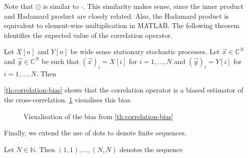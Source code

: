 \documentclass[a4paper, openany, oneside]{memoir}
\begin{document}
Note that $\odot$ is similar to $\cdot$. This similarity makes sense, since the inner product and Hadamard product are closely related. Also, the Hadamard product is equivalent to element-wise multiplication in MATLAB.
The following theorem identifies the expected value of the correlation operator.

\begin{blockTheorem} 
    Let $X[n]$ and $Y[n]$ be wide sense stationary stochastic processes. Let $\vec{x} \in \mathbb{C}^N$ and $\vec{y} \in \mathbb{C}^N$ be such that $(\vec{x})_i = X[i]$ for $i=1,\ldots,N$ and $(\vec{y})_i = Y[i]$ for $i=1,\ldots,N$.  Then

     \nolinebreak
\end{blockTheorem}

\cref{th:correlation-bias} shows that the correlation operator is a biased estimator of the cross-correlation. \cref{fig:vis-bias} visualises this bias.

\begin{figure}
    \centering
    \caption{Visualisation of the bias from \cref{th:correlation-bias}}
    \label{fig:vis-bias}
\end{figure}

Finally, we extend the use of dots to denote finite sequences.

\begin{blockDefinition} 
    Let $N \in \mathbb{N}$. Then $(1,1),\ldots,(N,N)$ denotes the sequence

     \nolinebreak
\end{blockDefinition}
\end{document}

